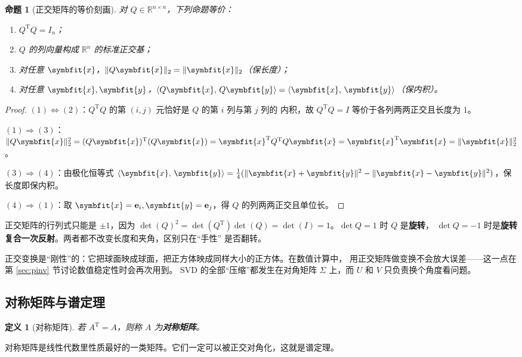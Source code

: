 \documentclass[UTF8, 11pt, a4paper, fontset=windows]{ctexart}
\theoremstyle{cnthm}
\newtheorem{prop}[thm]{命题}
\theoremstyle{cndef}
\newtheorem{defn}{定义}[section]
\newcommand{\T}{^{\mathrm{T}}}
\newcommand{\R}{\mathbb{R}}
\newcommand{\nrm}[1]{\lVert #1 \rVert}
\newcommand{\ip}[2]{\langle #1,\, #2\rangle}
\newcommand{\x}{\symbfit{x}}
\newcommand{\y}{\symbfit{y}}
\begin{document}
\begin{prop}[正交矩阵的等价刻画]\label{prop:orth-equiv}
对 $Q\in\R^{n\times n}$，下列命题等价：
\begin{enumerate}
  \item $Q\T Q=I_n$；
  \item $Q$ 的列向量构成 $\R^n$ 的标准正交基；
  \item 对任意 $\x$，$\nrm{Q\x}_2=\nrm{\x}_2$（保长度）；
  \item 对任意 $\x,\y$，$\ip{Q\x}{Q\y}=\ip{\x}{\y}$（保内积）。
\end{enumerate}
\end{prop}

\begin{proof}
$(1)\Leftrightarrow(2)$：$Q\T Q$ 的第 $(i,j)$ 元恰好是 $Q$ 的第 $i$ 列与第 $j$ 列的
内积，故 $Q\T Q=I$ 等价于各列两两正交且长度为 $1$。

$(1)\Rightarrow(3)$：$\nrm{Q\x}_2^2=(Q\x)\T(Q\x)=\x\T Q\T Q\x=\x\T\x=\nrm{\x}_2^2$。

$(3)\Rightarrow(4)$：由极化恒等式
$\ip{\x}{\y}=\tfrac14(\nrm{\x+\y}^2-\nrm{\x-\y}^2)$，保长度即保内积。

$(4)\Rightarrow(1)$：取 $\x=\mathbf{e}_i,\y=\mathbf{e}_j$，得 $Q$ 的列两两正交且单位长。
\end{proof}

正交矩阵的行列式只能是 $\pm1$，因为
$\det(Q)^2=\det(Q\T)\det(Q)=\det(I)=1$。$\det Q=1$ 时 $Q$ 是\textbf{旋转}，
$\det Q=-1$ 时是\textbf{旋转复合一次反射}。两者都不改变长度和夹角，区别只在“手性”
是否翻转。

\begin{insight}[为什么正交变换这么重要]
正交变换是“刚性”的：它把球面映成球面，把正方体映成同样大小的正方体。在数值计算中，
用正交矩阵做变换不会放大误差——这一点在第 \ref{sec:pinv} 节讨论数值稳定性时会再次用到。
SVD 的全部“压缩”都发生在对角矩阵 $\Sigma$ 上，而 $U$ 和 $V$ 只负责换个角度看问题。
\end{insight}

\subsection{对称矩阵与谱定理}

\begin{defn}[对称矩阵]
若 $A\T=A$，则称 $A$ 为\textbf{对称矩阵}。
\end{defn}

对称矩阵是线性代数里性质最好的一类矩阵。它们一定可以被正交对角化，这就是谱定理。
\end{document}
